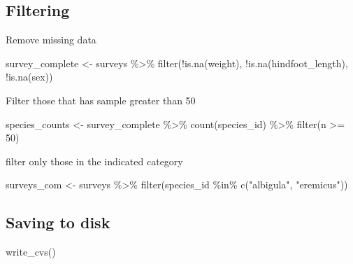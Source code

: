 \documentclass[
  letterpaper,
  DIV=11,
  numbers=noendperiod]{scrreprt}
\newenvironment{Shaded}{\begin{snugshade}}{\end{snugshade}}
\newcommand{\DecValTok}[1]{\textcolor[rgb]{0.68,0.00,0.00}{#1}}
\newcommand{\FunctionTok}[1]{\textcolor[rgb]{0.28,0.35,0.67}{#1}}
\newcommand{\NormalTok}[1]{\textcolor[rgb]{0.00,0.23,0.31}{#1}}
\newcommand{\OtherTok}[1]{\textcolor[rgb]{0.00,0.23,0.31}{#1}}
\newcommand{\SpecialCharTok}[1]{\textcolor[rgb]{0.37,0.37,0.37}{#1}}
\newcommand{\StringTok}[1]{\textcolor[rgb]{0.13,0.47,0.30}{#1}}
\begin{document}
\subsection{Filtering}\label{filtering}

Remove missing data

\begin{Shaded}
\begin{Highlighting}[]
\NormalTok{survey\_complete }\OtherTok{\textless{}{-}}\NormalTok{ surveys }\SpecialCharTok{\%\textgreater{}\%}
  \FunctionTok{filter}\NormalTok{(}\SpecialCharTok{!}\FunctionTok{is.na}\NormalTok{(weight), }\SpecialCharTok{!}\FunctionTok{is.na}\NormalTok{(hindfoot\_length), }\SpecialCharTok{!}\FunctionTok{is.na}\NormalTok{(sex))}
\end{Highlighting}
\end{Shaded}

Filter those that has sample greater than 50

\begin{Shaded}
\begin{Highlighting}[]
\NormalTok{species\_counts }\OtherTok{\textless{}{-}}\NormalTok{ survey\_complete }\SpecialCharTok{\%\textgreater{}\%}
  \FunctionTok{count}\NormalTok{(species\_id) }\SpecialCharTok{\%\textgreater{}\%}
  \FunctionTok{filter}\NormalTok{(n }\SpecialCharTok{\textgreater{}=} \DecValTok{50}\NormalTok{)}
\end{Highlighting}
\end{Shaded}

filter only those in the indicated category

\begin{Shaded}
\begin{Highlighting}[]
\NormalTok{surveys\_com }\OtherTok{\textless{}{-}}\NormalTok{ surveys }\SpecialCharTok{\%\textgreater{}\%}
  \FunctionTok{filter}\NormalTok{(species\_id }\SpecialCharTok{\%in\%} \FunctionTok{c}\NormalTok{(}\StringTok{"albigula"}\NormalTok{, }\StringTok{"eremicus"}\NormalTok{))}
\end{Highlighting}
\end{Shaded}

\subsection{Saving to disk}\label{saving-to-disk}

\begin{Shaded}
\begin{Highlighting}[]
\FunctionTok{write\_cvs}\NormalTok{()}
\end{Highlighting}
\end{Shaded}
\end{document}
